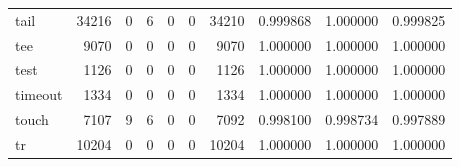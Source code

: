 \begin{longtable}{lrrrrrrrrr}
tail      &                               34216 &                                               0 &                                              6 &                                             0 &                                              0 &                                        34210 &                                           0.999868 &                               1.000000 &                             0.999825 \\
tee       &                                9070 &                                               0 &                                              0 &                                             0 &                                              0 &                                         9070 &                                           1.000000 &                               1.000000 &                             1.000000 \\
test      &                                1126 &                                               0 &                                              0 &                                             0 &                                              0 &                                         1126 &                                           1.000000 &                               1.000000 &                             1.000000 \\
timeout   &                                1334 &                                               0 &                                              0 &                                             0 &                                              0 &                                         1334 &                                           1.000000 &                               1.000000 &                             1.000000 \\
touch     &                                7107 &                                               9 &                                              6 &                                             0 &                                              0 &                                         7092 &                                           0.998100 &                               0.998734 &                             0.997889 \\
tr        &                               10204 &                                               0 &                                              0 &                                             0 &                                              0 &                                        10204 &                                           1.000000 &                               1.000000 &                             1.000000 \\

\end{longtable}
